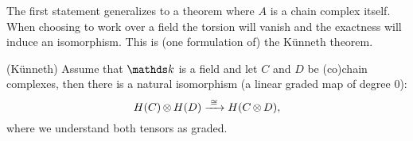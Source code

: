 The first statement generalizes to a theorem where $A$ is a chain complex itself. When choosing to work over a field the torsion will vanish and the exactness will induce an isomorphism. This is (one formulation of) the Künneth theorem.

\begin{theorem}
	(Künneth) Assume that $\k$ is a field and let $C$ and $D$ be (co)chain complexes, then there is a natural isomorphism (a linear graded map of degree $0$):
	$$ H(C) \operatorname*{\otimes} H(D) \xrightarrow{\,\,{\cong}\,\,} H(C \operatorname*{\otimes} D), $$
	where we understand both tensors as graded.
\end{theorem}

